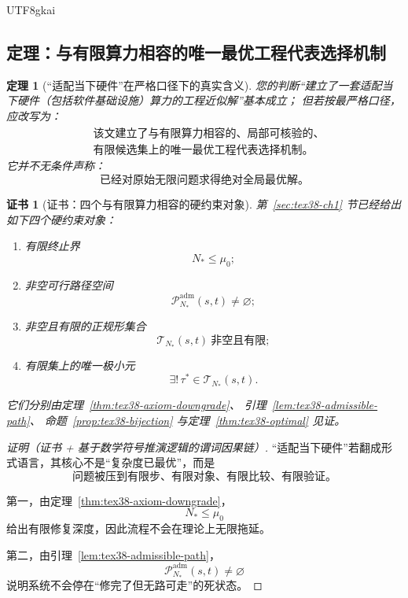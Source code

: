 \documentclass[12pt]{article}
\newtheorem{theorem}{定理}[section]
\newtheorem{Certificate}{证书}[section]
\begin{document}
\begin{CJK*}{UTF8}{gkai}
\subsection{定理：与有限算力相容的唯一最优工程代表选择机制}
\label{subsec:tex38-bridge-hardware}

\begin{theorem}[“适配当下硬件”在严格口径下的真实含义]
\label{thm:tex38-bridge-hardware}
您的判断“建立了一套适配当下硬件（包括软件基础设施）算力的工程近似解”基本成立；
但若按最严格口径，应改写为：
\[
  \begin{aligned}
    &\text{该文建立了与有限算力相容的、局部可核验的、}\\
    &\text{有限候选集上的唯一最优工程代表选择机制。}
  \end{aligned}
\]
它并不无条件声称：
\[
  \text{已经对原始无限问题求得绝对全局最优解。}
\]
\end{theorem}

\begin{Certificate}[证书：四个与有限算力相容的硬约束对象]
\label{cert:tex38-bridge-hardware}
第~\ref{sec:tex38-ch1} 节已经给出如下四个硬约束对象：
\begin{enumerate}
  \item 有限终止界
  \[
    N_\ast\le \mu_0;
  \]
  \item 非空可行路径空间
  \[
    \mathcal{P}^{\mathrm{adm}}_{N_\ast}(s,t)\neq\varnothing;
  \]
  \item 非空且有限的正规形集合
  \[
    \mathcal{T}_{N_\ast}(s,t)\ \text{非空且有限};
  \]
  \item 有限集上的唯一极小元
  \[
    \exists!\,\tau^\ast\in\mathcal{T}_{N_\ast}(s,t).
  \]
\end{enumerate}
它们分别由定理~\ref{thm:tex38-axiom-downgrade}、
引理~\ref{lem:tex38-admissible-path}、
命题~\ref{prop:tex38-bijection} 与定理~\ref{thm:tex38-optimal} 见证。
\end{Certificate}

\begin{proof}[证明（证书 + 基于数学符号推演逻辑的谓词因果链）]
“适配当下硬件”若翻成形式语言，其核心不是“复杂度已最优”，而是
\[
  \text{问题被压到有限步、有限对象、有限比较、有限验证。}
\]

第一，由定理~\ref{thm:tex38-axiom-downgrade}，
\[
  N_\ast\le\mu_0
\]
给出有限修复深度，因此流程不会在理论上无限拖延。

第二，由引理~\ref{lem:tex38-admissible-path}，
\[
  \mathcal{P}^{\mathrm{adm}}_{N_\ast}(s,t)\neq\varnothing
\]
说明系统不会停在“修完了但无路可走”的死状态。


\end{proof}
\end{CJK*}
\end{document}
